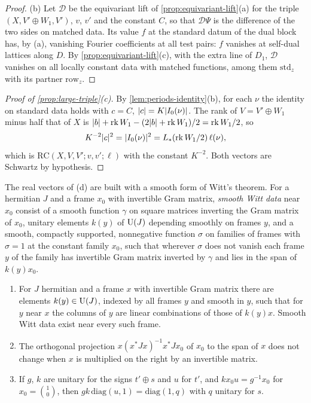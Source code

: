 \begin{proof}
(b) Let $\mathcal D$ be the equivariant lift of \cref{prop:equivariant-lift}(a) for the triple $(X,V'\oplus W_1,V')$, $v$, $v'$ and the constant $C$, so that $\mathcal D\Psi$ is the difference of the two sides on
matched data. Its value $f$ at the standard datum of the dual block has, by (a), vanishing Fourier coefficients at all test pairs: $f$ vanishes at self-dual lattices along $D$. By
\cref{prop:equivariant-lift}(c), with the extra line of $D_1$, $\mathcal D$ vanishes on all locally constant data with matched functions, among them $\mathrm{std}_z$ with its partner $\mathrm{row}_z$.
\end{proof}

\begin{proof}[Proof of \cref{prop:large-triple}(c)]
By \cref{lem:periods-identity}(b), for each $\nu$ the identity on standard data holds with $c=C$, $\lvert c\rvert=K\lvert I_0(\nu)\rvert$. The rank of $V=V'\oplus W_1$ minus half that of $X$ is
$\lvert b\rvert+\operatorname{rk}W_1-(2\lvert b\rvert+\operatorname{rk}W_1)/2=\operatorname{rk}W_1/2$, so
\[
  K^{-2}\lvert c\rvert^2=\lvert I_0(\nu)\rvert^2=L_*(\operatorname{rk}W_1/2)\,\ell(\nu),
\]
which is $\mathrm{RC}(X,V,V';v,v';\ell)$ with the constant $K^{-2}$. Both vectors are Schwartz by hypothesis.
\end{proof}

The real vectors of (d) are built with a smooth form of Witt's theorem. For a hermitian $J$ and a frame $x_0$ with invertible Gram matrix, \emph{smooth Witt data} near $x_0$ consist of a smooth function $\gamma$ on
square matrices inverting the Gram matrix of $x_0$, unitary elements $k(y)$ of $\operatorname{U}(J)$ depending smoothly on frames $y$, and a smooth, compactly supported, nonnegative function $\sigma$ on families of frames
with $\sigma=1$ at the constant family $x_0$, such that wherever $\sigma$ does not vanish each frame $y$ of the family has invertible Gram matrix inverted by $\gamma$ and lies in the span of $k(y)x_0$.

\begin{lemma}\label{lem:smooth-witt}
\begin{enumerate}[label=\textup{(\alph*)}]
\item For $J$ hermitian and a frame $x$ with invertible Gram matrix there are elements $k(y)\in\operatorname{U}(J)$, indexed by all frames $y$ and smooth in $y$, such that for $y$ near $x$ the columns of $y$ are linear
combinations of those of $k(y)x$. Smooth Witt data exist near every such frame.
\item The orthogonal projection $x(x^*Jx)^{-1}x^*Jx_0$ of $x_0$ to the span of $x$ does not change when $x$ is multiplied on the right by an invertible matrix.
\item If $g$, $k$ are unitary for the signs $t'\oplus s$ and $u$ for $t'$, and $kx_0u=g^{-1}x_0$ for $x_0=\binom10$, then $gk\,\mathrm{diag}(u,1)=\mathrm{diag}(1,q)$ with $q$ unitary for $s$.
\end{enumerate}
\end{lemma}

